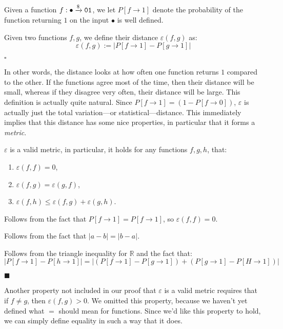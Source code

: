 \begin{definition}
    Given a function $f : \bullet \xrightarrow{\$} \texttt{01}$, we let
    $P[f \to 1]$ denote the probability
    of the function returning $1$ on the input $\bullet$ is well defined.

    Given two functions $f, g$, we define their distance $\varepsilon(f, g)$ as:
    $$
    \varepsilon(f, g) := |P[f \to 1] - P[g \to 1]|
    $$

    $\square$
\end{definition}

In other words, the distance looks at how often one function returns $1$
compared to the other.
If the functions agree most of the time, then their distance will be small,
whereas if they disagree very often, their distance will be large.
This definition is actually quite natural.
Since $P[f \to 1] = (1 - P[f \to 0])$, $\varepsilon$ is actually
just the total variation---or statistical---distance.
This immediately implies that this distance has some nice properties,
in particular that it forms a \emph{metric}.

\begin{lemma}
    $\varepsilon$ is a valid metric, in particular, it holds
    for any functions $f, g, h$, that:
    \begin{enumerate}
        \item $\varepsilon(f, f) = 0$,
        \item $\varepsilon(f, g) = \varepsilon(g, f)$,
        \item $\varepsilon(f, h) \leq \varepsilon(f, g) + \varepsilon(g, h)$.
    \end{enumerate}


     Follows from the fact that $P[f \to 1] = P[f \to 1]$,
    so $\varepsilon(f, f) = 0$.

     Follows from the fact that $|a - b| = |b - a|$.

     Follows from the triangle inequality for $\mathbb{R}$
    and the fact that:
    $$
    |P[f \to 1] - P[h \to 1]| = |(P[f \to 1] - P[g \to 1]) + (P[g \to 1] - P[H \to 1])|
    $$

    $\blacksquare$
\end{lemma}

Another property not included in our proof that $\varepsilon$ is a valid metric
requires that if $f \neq g$, then $\varepsilon(f, g) > 0$.
We omitted this property, because we haven't yet defined what $=$
should mean for functions.
Since we'd like this property to hold, we can simply define
equality in such a way that it does.


